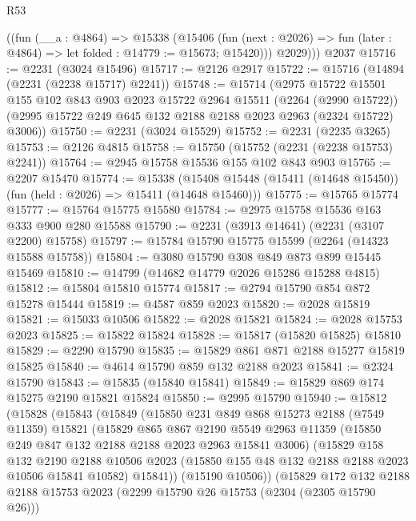\begin{lexlean}{R53}
\begin{coremodule}
        ((fun (__a : @4864) =>
        @15338
          (@15406
            (fun (next : @2026) => fun (later : @4864) => let folded : @14779 := @15673; @15420)))
          @2029)))
    @2037
@15716 := @2231 (@3024 @15496)
@15717 := @2126 @2917
@15722 := @15716 (@14894 (@2231 (@2238 @15717) @2241))
@15748 := @15714
    (@2975
      @15722
      @15501
      @155
      @102
      @843
      @903
      @2023
      @15722
      @2964
      @15511
      (@2264 (@2990 @15722))
      (@2995 @15722 @249 @645 @132 @2188 @2188 @2023 @2963 (@2324 @15722) @3006))
@15750 := @2231 (@3024 @15529)
@15752 := @2231 (@2235 @3265)
@15753 := @2126 @4815
@15758 := @15750 (@15752 (@2231 (@2238 @15753) @2241))
@15764 := @2945 @15758 @15536 @155 @102 @843 @903
@15765 := @2207 @15470
@15774 := @15338
    (@15408 @15448 (@15411 (@14648 @15450)) (fun (held : @2026) => @15411 (@14648 @15460)))
@15775 := @15765 @15774
@15777 := @15764 @15775 @15580
@15784 := @2975 @15758 @15536 @163 @333 @900 @280 @15588
@15790 := @2231 (@3913 @14641) (@2231 (@3107 @2200) @15758)
@15797 := @15784 @15790 @15775 @15599 (@2264 (@14323 @15588 @15758))
@15804 := @3080 @15790 @308 @849 @873 @899 @15445 @15469
@15810 := @14799 (@14682 @14779 @2026 @15286 @15288 @4815)
@15812 := @15804 @15810 @15774
@15817 := @2794 @15790 @854 @872 @15278 @15444
@15819 := @4587 @859 @2023
@15820 := @2028 @15819
@15821 := @15033 @10506
@15822 := @2028 @15821
@15824 := @2028 @15753 @2023
@15825 := @15822 @15824
@15828 := @15817 (@15820 @15825) @15810
@15829 := @2290 @15790
@15835 := @15829 @861 @871 @2188 @15277 @15819 @15825
@15840 := @4614 @15790 @859 @132 @2188 @2023
@15841 := @2324 @15790
@15843 := @15835 (@15840 @15841)
@15849 := @15829 @869 @174 @15275 @2190 @15821 @15824
@15850 := @2995 @15790
@15940 := @15812
    (@15828
      (@15843
        (@15849
          (@15850
            @231
            @849
            @868
            @15273
            @2188
            (@7549 @11359)
            @15821
            (@15829
              @865
              @867
              @2190
              @5549
              @2963
              @11359
              (@15850 @249 @847 @132 @2188 @2188 @2023 @2963 @15841 @3006)
              (@15829
                @158
                @132
                @2190
                @2188
                @10506
                @2023
                (@15850 @155 @48 @132 @2188 @2188 @2023 @10506 @15841 @10582)
                @15841))
            (@15190 @10506))
          (@15829
            @172
            @132
            @2188
            @2188
            @15753
            @2023
            (@2299 @15790 @26 @15753 (@2304 (@2305 @15790 @26)))

\end{coremodule}
\end{lexlean}
